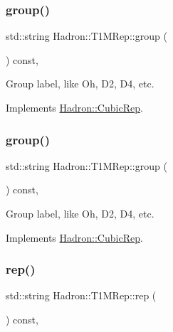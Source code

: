\subsubsection{\texorpdfstring{group()}{group()}\hspace{0.1cm}{\footnotesize\ttfamily [2/3]}}
{\footnotesize\ttfamily std\+::string Hadron\+::\+T1\+M\+Rep\+::group (\begin{DoxyParamCaption}{ }\end{DoxyParamCaption}) const\hspace{0.3cm}{\ttfamily [inline]}, {\ttfamily [virtual]}}

Group label, like Oh, D2, D4, etc. 

Implements \mbox{\hyperlink{structHadron_1_1CubicRep_a0748f11ec87f387062c8e8981339a29c}{Hadron\+::\+Cubic\+Rep}}.

\mbox{\label{structHadron_1_1T1MRep_afd1a046d8c258d11503b579df7489634}} 
\subsubsection{\texorpdfstring{group()}{group()}\hspace{0.1cm}{\footnotesize\ttfamily [3/3]}}
{\footnotesize\ttfamily std\+::string Hadron\+::\+T1\+M\+Rep\+::group (\begin{DoxyParamCaption}{ }\end{DoxyParamCaption}) const\hspace{0.3cm}{\ttfamily [inline]}, {\ttfamily [virtual]}}

Group label, like Oh, D2, D4, etc. 

Implements \mbox{\hyperlink{structHadron_1_1CubicRep_a0748f11ec87f387062c8e8981339a29c}{Hadron\+::\+Cubic\+Rep}}.

\mbox{\label{structHadron_1_1T1MRep_a2a30092deab94944ea636fd8715be68d}} 
\subsubsection{\texorpdfstring{rep()}{rep()}\hspace{0.1cm}{\footnotesize\ttfamily [1/3]}}
{\footnotesize\ttfamily std\+::string Hadron\+::\+T1\+M\+Rep\+::rep (\begin{DoxyParamCaption}{ }\end{DoxyParamCaption}) const\hspace{0.3cm}{\ttfamily [inline]}, {\ttfamily [virtual]}}

